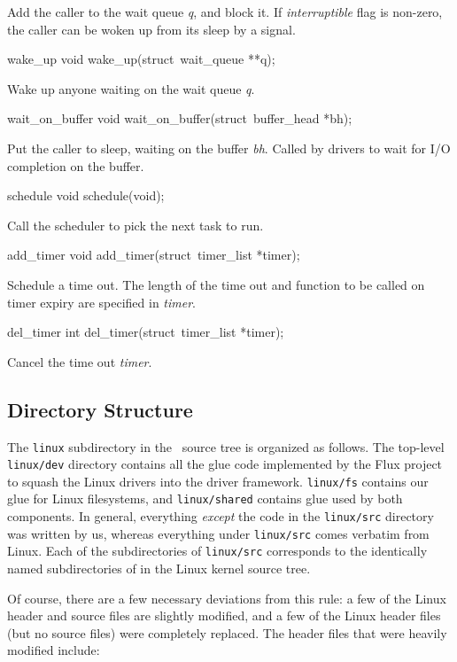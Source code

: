 \begin{icsymlist}
Add the caller to the wait queue \emph{q}, and block it.
If \emph{interruptible} flag is non-zero, the caller can be woken up from
its sleep by a signal.

\item[wake_up]
\funcproto void wake_up(struct~wait_queue **q);

Wake up anyone waiting on the wait queue \emph{q}.

\item[wait_on_buffer]
\funcproto void wait_on_buffer(struct~buffer_head *bh);

Put the caller to sleep, waiting on the buffer \emph{bh}.
Called by drivers to wait for I/O completion on the buffer.

\item[schedule]
\funcproto void schedule(void);

Call the scheduler to pick the next task to run.

\item[add_timer]
\funcproto void add_timer(struct~timer_list *timer);

Schedule a time out.  The length of the time out and function to be called
on timer expiry are specified in \emph{timer}.

\item[del_timer]
\funcproto int del_timer(struct~timer_list *timer);

Cancel the time out \emph{timer}.
\end{icsymlist}


\subsection{Directory Structure}

The {\tt linux} subdirectory in the \oskit\ source tree
is organized as follows.
The top-level {\tt linux/dev} directory
contains all the glue code implemented by the Flux project
to squash the Linux drivers into the \oskit{} driver framework.
{\tt linux/fs} contains our glue for Linux filesystems,
and {\tt linux/shared} contains glue used by both components.
In general, everything \emph{except} the code in the {\tt linux/src} directory
was written by us, whereas everything under {\tt linux/src}
comes verbatim from Linux.
Each of the subdirectories of {\tt linux/src}
corresponds to the identically named subdirectories
of in the Linux kernel source tree.

Of course, there are a few necessary deviations from this rule:
a few of the Linux header and source files are slightly modified,
and a few of the Linux header files (but no source files)
were completely replaced.
The header files that were heavily modified include:

